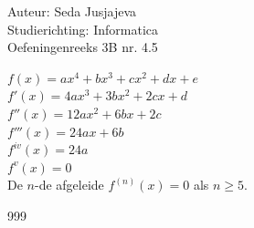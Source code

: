 \documentclass[a4paper]{article}
\begin{document}
\noindent \large Auteur: Seda Jusjajeva\\
\noindent \large Studierichting: Informatica\\
\noindent \large Oefeningenreeks 3B nr. 4.5 \\

\medskip

\normalsize


$f(x) = ax^4 + bx^3 + cx^2 +dx + e$ \\

$f'(x) = 4ax^3 + 3bx^2 + 2cx + d$ \\

$f''(x) = 12ax^2 + 6bx + 2c$ \\

$f'''(x) = 24ax + 6b$ \\

$f^{iv}(x) = 24a$ \\

$f^{v}(x) = 0$ \\

De $n$-de afgeleide $f^{(n)}(x) = 0$ als $n \geq 5$. \\




\begin{thebibliography}{999}
\end{thebibliography}
\end{document}
